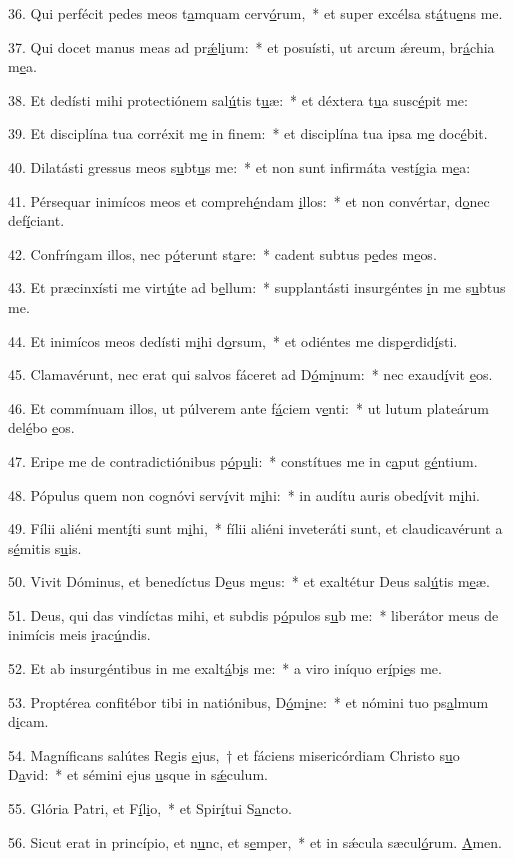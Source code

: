 36. Qui perfécit pedes meos t\uline{a}mquam cerv\uline{ó}rum,~* et super excélsa st\uline{á}tu\uline{e}ns me.\par 
37. Qui docet manus meas ad pr\uline{ǽ}l\uline{i}um:~* et posuísti, ut arcum ǽreum, br\uline{á}chia m\uline{e}a.\par 
38. Et dedísti mihi protectiónem sal\uline{ú}tis t\uline{u}æ:~* et déxtera t\uline{u}a susc\uline{é}pit me:\par 
39. Et disciplína tua corréxit m\uline{e} in f\uline{i}nem:~* et disciplína tua ipsa m\uline{e} doc\uline{é}bit.\par 
40. Dilatásti gressus meos s\uline{u}bt\uline{u}s me:~* et non sunt infirmáta vest\uline{í}gia m\uline{e}a:\par 
41. Pérsequar inimícos meos et compreh\uline{é}ndam \uline{i}llos:~* et non convértar, d\uline{o}nec def\uline{í}ciant.\par 
42. Confríngam illos, nec p\uline{ó}terunt st\uline{a}re:~* cadent subtus p\uline{e}des m\uline{e}os.\par 
43. Et præcinxísti me virt\uline{ú}te ad b\uline{e}llum:~* supplantásti insurgéntes \uline{i}n me s\uline{u}btus me.\par 
44. Et inimícos meos dedísti m\uline{i}hi d\uline{o}rsum,~* et odiéntes me disp\uline{e}rdid\uline{í}sti.\par 
45. Clamavérunt, nec erat qui salvos fáceret ad D\uline{ó}m\uline{i}num:~* nec exaud\uline{í}vit \uline{e}os.\par 
46. Et commínuam illos, ut púlverem ante f\uline{á}ciem v\uline{e}nti:~* ut lutum plateárum del\uline{é}bo \uline{e}os.\par 
47. Eripe me de contradictiónibus p\uline{ó}p\uline{u}li:~* constítues me in c\uline{a}put g\uline{é}ntium.\par 
48. Pópulus quem non cognóvi serv\uline{í}vit m\uline{i}hi:~* in audítu auris obed\uline{í}vit m\uline{i}hi.\par 
49. Fílii aliéni ment\uline{í}ti sunt m\uline{i}hi,~* fílii aliéni inveteráti sunt, et claudicavérunt a s\uline{é}mitis s\uline{u}is.\par 
50. Vivit Dóminus, et benedíctus D\uline{e}us m\uline{e}us:~* et exaltétur Deus sal\uline{ú}tis m\uline{e}æ.\par 
51. Deus, qui das vindíctas mihi, et subdis p\uline{ó}pulos s\uline{u}b me:~* liberátor meus de inimícis meis \uline{i}rac\uline{ú}ndis.\par 
52. Et ab insurgéntibus in me exalt\uline{á}b\uline{i}s me:~* a viro iníquo er\uline{í}pi\uline{e}s me.\par 
53. Proptérea confitébor tibi in natiónibus, D\uline{ó}m\uline{i}ne:~* et nómini tuo ps\uline{a}lmum d\uline{i}cam.\par 
54. Magníficans salútes Regis \uline{e}jus,~† et fáciens misericórdiam Christo s\uline{u}o D\uline{a}vid:~* et sémini ejus \uline{u}sque in s\uline{ǽ}culum.\par 
55. Glória Patri, et F\uline{í}l\uline{i}o,~* et Spir\uline{í}tui S\uline{a}ncto.\par 
56. Sicut erat in princípio, et n\uline{u}nc, et s\uline{e}mper,~* et in sǽcula sæcul\uline{ó}rum. \uline{A}men.\par 
